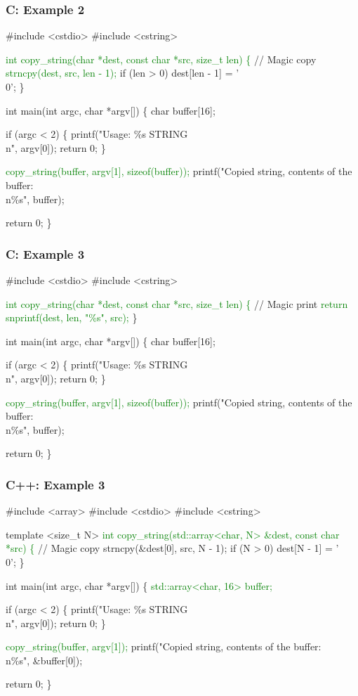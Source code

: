 \documentclass[usenames,dvipsnames]{beamer}
\newcommand{\greenalert}[1] {\alert{\textcolor{green}{#1}}}
\begin{document}
\begin{frame}[fragile]
\frametitle{C: Example 2}
\tiny
\begin{semiverbatim}
\#include <cstdio>
\#include <cstring>

\greenalert{int copy\_string(char *dest, const char *src, size\_t len) \{} 
  // Magic copy
  \greenalert{strncpy(dest, src, len - 1);}
  if (len > 0)
    dest[len - 1] = '\\0';
\}

int main(int argc, char *argv[]) \{
  char buffer[16];

  if (argc < 2) \{
    printf("Usage: \%s STRING\\n", argv[0]);
    return 0;
  \}

  \greenalert{copy\_string(buffer, argv[1], sizeof(buffer));}
  printf("Copied string, contents of the buffer:\\n\%s", buffer);

  return 0;
\}
\end{semiverbatim}
\end{frame}

\begin{frame}[fragile]
\frametitle{C: Example 3}
\tiny
\begin{semiverbatim}
\#include <cstdio>
\#include <cstring>

\greenalert{int copy\_string(char *dest, const char *src, size\_t len) \{} 
  // Magic print
  \greenalert{return snprintf(dest, len, "\%s", src);}
\}

int main(int argc, char *argv[]) \{
  char buffer[16];

  if (argc < 2) \{
    printf("Usage: \%s STRING\\n", argv[0]);
    return 0;
  \}

  \greenalert{copy\_string(buffer, argv[1], sizeof(buffer));}
  printf("Copied string, contents of the buffer:\\n\%s", buffer);

  return 0;
\}
\end{semiverbatim}
\end{frame}

\begin{frame}[fragile]
\frametitle{C++: Example 3}
\tiny
\begin{semiverbatim}
\#include <array>
\#include <cstdio>
\#include <cstring>

template <size\_t N>
\greenalert{int copy\_string(std::array<char, N> &dest, const char *src) \{}
  // Magic copy 
  strncpy(&dest[0], src, N - 1);
  if (N > 0)
    dest[N - 1] = '\\0';
\}

int main(int argc, char *argv[]) \{
  \greenalert{std::array<char, 16> buffer;}

  if (argc < 2) \{
    printf("Usage: \%s STRING\\n", argv[0]);
    return 0;
  \}

  \greenalert{copy\_string(buffer, argv[1]);}
  printf("Copied string, contents of the buffer:\\n\%s", &buffer[0]);

  return 0;
\}
\end{semiverbatim}
\end{frame}
\end{document}
